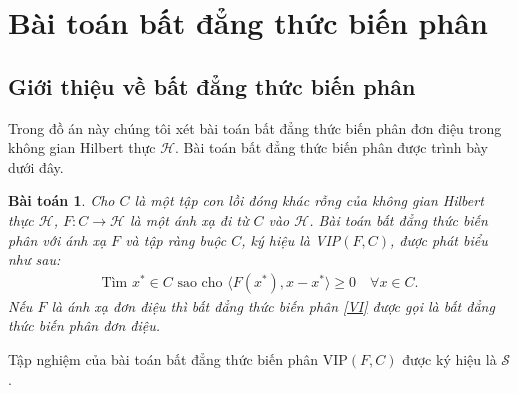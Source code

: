 \documentclass[14pt, oneside,A4paper]{book}
\theoremstyle{plain}
\newtheorem{bt}[theorem]{Bài toán}
\begin{document}
\section{Bài toán bất đẳng thức biến phân}


\subsection{Giới thiệu về bất đẳng thức biến phân}


Trong đồ án này chúng tôi xét bài toán bất đẳng thức biến phân đơn điệu trong không gian Hilbert thực $\mathcal H$. Bài toán bất đẳng thức biến phân được trình bày dưới đây.

\begin{bt}\rm 
	Cho $C$ là một tập con lồi đóng khác rỗng của không gian Hilbert thực $\mathcal H$, $F:C\to \mathcal H$ là một ánh xạ đi từ $C$ vào $\mathcal H$. Bài toán bất đẳng thức biến phân với ánh xạ $F$ và tập ràng buộc $C$, ký hiệu là  VIP$(F,C)$, được phát biểu như sau:
	\begin{align}\label{VI}
	\text{Tìm $x^*\in C$ sao cho } \langle F(x^*), x-x^*\rangle \ge 0 \quad \forall x\in C. 
	\end{align}
	Nếu $F$ là ánh xạ đơn điệu thì bất đẳng thức biến phân \eqref{VI} được gọi là bất đẳng thức biến phân đơn điệu.
\end{bt} 
Tập nghiệm của bài toán bất đẳng thức biến phân VIP$(F,C)$ được ký hiệu là $\mathcal S$.
\end{document}

